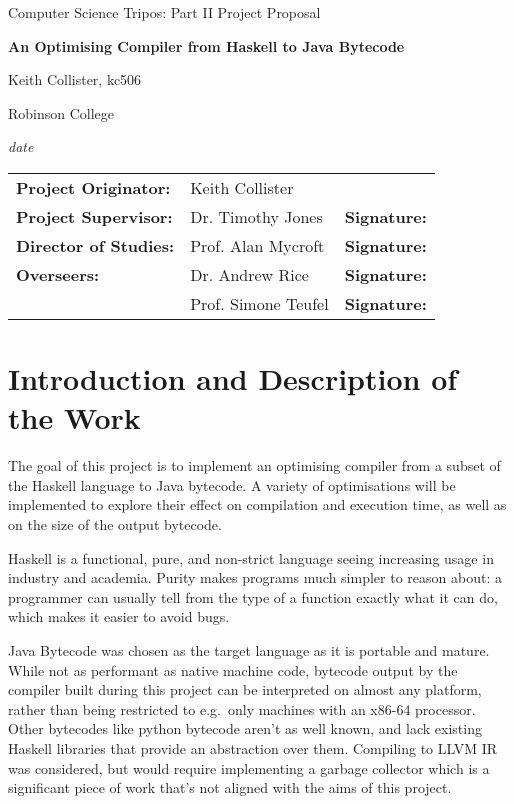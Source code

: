 \documentclass[12pt]{article}
\begin{document}
\thispagestyle{empty}

\centerline{\large Computer Science Tripos: Part II Project Proposal}
\vspace{0.4in}
\centerline{\Large\bf An Optimising Compiler from Haskell to Java Bytecode}
\vspace{0.3in}

\centerline{Keith Collister, kc506}
\centerline{Robinson College}

\centerline{\large \emph{date}}

\vspace{1in}

\begin{tabular}{ p{4cm} p{4.5cm} l }
{\bf Project Originator:} & Keith Collister & \\[3mm]
{\bf Project Supervisor:} & Dr. Timothy Jones & {\bf Signature:} \\[3mm]
{\bf Director of Studies:} & Prof. Alan Mycroft & {\bf Signature:} \\[3mm]
{\bf Overseers:} & Dr. Andrew Rice & {\bf Signature:} \\[3mm]
                 & Prof. Simone Teufel & {\bf Signature:} \\[3mm]
\end{tabular}

\vspace{0.75in}




\section*{Introduction and Description of the Work}

The goal of this project is to implement an optimising compiler from a subset of the Haskell language to Java bytecode.
A variety of optimisations will be implemented to explore their effect on compilation and execution time, as well as on
the size of the output bytecode.

Haskell is a functional, pure, and non-strict language seeing increasing usage in industry and academia. Purity makes
programs much simpler to reason about: a programmer can usually tell from the type of a function exactly what it can do,
which makes it easier to avoid bugs.

Java Bytecode was chosen as the target language as it is portable and mature. While not as performant as native machine
code, bytecode output by the compiler built during this project can be interpreted on almost any platform, rather than
being restricted to e.g.\ only machines with an x86-64 processor. Other bytecodes like python bytecode aren't as
well known, and lack existing Haskell libraries that provide an abstraction over them. Compiling to LLVM IR was
considered, but would require implementing a garbage collector which is a significant piece of work that's not aligned
with the aims of this project.
\end{document}
